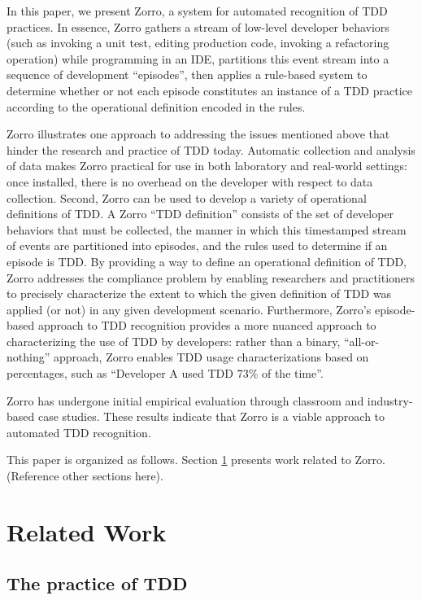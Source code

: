 \documentclass[smallextended]{svjour3}     %
\begin{document}
In this paper, we present Zorro, a system for automated recognition of TDD
practices.  In essence, Zorro gathers a stream of low-level developer
behaviors (such as invoking a unit test, editing production code, invoking
a refactoring operation) while programming in an IDE, partitions this event
stream into a sequence of development ``episodes'', then applies a
rule-based system to determine whether or not each episode constitutes an
instance of a TDD practice according to the operational definition encoded in the rules.

Zorro illustrates one approach to addressing the issues mentioned above
that hinder the research and practice of TDD today.  Automatic collection
and analysis of data makes Zorro practical for use in both laboratory and
real-world settings: once installed, there is no overhead on the developer
with respect to data collection.  Second, Zorro can be used to develop a
variety of operational definitions of TDD. A Zorro ``TDD definition''
consists of the set of developer behaviors that must be collected, the
manner in which this timestamped stream of events are partitioned into
episodes, and the rules used to determine if an episode is TDD.  By
providing a way to define an operational definition of TDD, Zorro addresses
the compliance problem by enabling researchers and practitioners to
precisely characterize the extent to which the given definition of TDD was
applied (or not) in any given development scenario.  Furthermore, Zorro's
episode-based approach to TDD recognition provides a more nuanced approach
to characterizing the use of TDD by developers: rather than a binary,
``all-or-nothing'' approach, Zorro enables TDD usage characterizations
based on percentages, such as ``Developer A used TDD 73\% of the time''.

Zorro has undergone initial empirical evaluation through classroom and
industry-based case studies.  These results indicate that Zorro is a viable
approach to automated TDD recognition.

This paper is organized as follows.  Section \ref{sec:RelatedWork} presents
work related to Zorro.  (Reference other sections here).

\section{Related Work}
\label{sec:RelatedWork}

\subsection{The practice of TDD}
\end{document}
